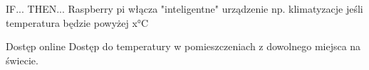     \begin{frame}{IF... THEN...}
        \centering
        Raspberry pi włącza "inteligentne" urządzenie np. klimatyzacje jeśli temperatura będzie powyżej x°C
        
    \end{frame}
    
    \begin{frame}{Dostęp online}
        \centering
        Dostęp do temperatury w pomieszczeniach z dowolnego miejsca na świecie.
        
    \end{frame}
    